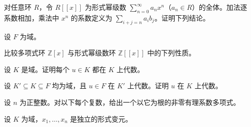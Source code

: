 \noindent\begin{minipage}{\textwidth}
对任意环 $R$，令 $R[[x]]$ 为形式幂级数 $\sum_{n=0}^{\infty}a_nx^n$（$a_n\in R$）的全体。加法逐系数相加，乘法中 $x^n$ 的系数定义为 $\sum_{i+j=n}a_i b_j$。证明下列结论。
\end{minipage}\par\vfill
\noindent\begin{minipage}{\textwidth}
设 $F$ 为域。
\end{minipage}\par\vfill
\newpage
\noindent\begin{minipage}{\textwidth}
比较多项式环 $\mathbb{Z}[x]$ 与形式幂级数环 $\mathbb{Z}[[x]]$ 中的下列性质。
\end{minipage}\par\vfill
\noindent\begin{minipage}{\textwidth}
设 $K$ 是域。证明每个 $u\in K$ 都在 $K$ 上代数。
\end{minipage}\par\vfill
\noindent\begin{minipage}{\textwidth}
设 $K'\subseteq K\subseteq F$ 均为域，且 $u\in F$ 在 $K'$ 上代数。证明 $u$ 在 $K$ 上代数。
\end{minipage}\par\vfill
\newpage
\noindent\begin{minipage}{\textwidth}
设 $n$ 为正整数。对以下每个复数，给出一个以它为根的非零有理系数多项式。
\end{minipage}\par\vfill
\noindent\begin{minipage}{\textwidth}
设 $K$ 为域，$x_1,\ldots,x_n$ 是独立的形式变元。
\end{minipage}\par\vfill
